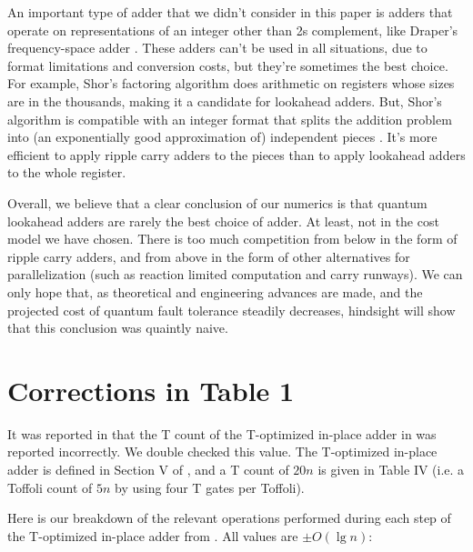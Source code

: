 \documentclass[onecolumn,unpublished]{quantumarticle}
\theoremstyle{definition}
\theoremstyle{definition}
\theoremstyle{definition}
\begin{document}
An important type of adder that we didn't consider in this paper is adders that operate on representations of an integer other than 2s complement, like Draper's frequency-space adder \cite{draper2000qftaddition}.
These adders can't be used in all situations, due to format limitations and conversion costs, but they're sometimes the best choice.
For example, Shor's factoring algorithm \cite{shor1994algorithms} does arithmetic on registers whose sizes are in the thousands, making it a candidate for lookahead adders.
But, Shor's algorithm is compatible with an integer format that splits the addition problem into (an exponentially good approximation of) independent pieces \cite{gidney2019approximate,gidney2019factor}.
It's more efficient to apply ripple carry adders to the pieces than to apply lookahead adders to the whole register.

Overall, we believe that a clear conclusion of our numerics is that quantum lookahead adders are rarely the best choice of adder.
At least, not in the cost model we have chosen.
There is too much competition from below in the form of ripple carry adders, and from above in the form of other alternatives for parallelization (such as reaction limited computation and carry runways).
We can only hope that, as theoretical and engineering advances are made, and the projected cost of quantum fault tolerance steadily decreases, hindsight will show that this conclusion was quaintly naive.




\appendix

\section{Corrections in Table 1}
\label{app:correction}

It was reported in \cite{oonishi2020efficient} that the T count of the T-optimized in-place adder in \cite{thapliyal2020lookahead} was reported incorrectly.
We double checked this value.
The T-optimized in-place adder is defined in Section V of \cite{thapliyal2020lookahead}, and a T count of $20n$ is given in Table IV (i.e. a Toffoli count of $5n$ by using four T gates per Toffoli).

Here is our breakdown of the relevant operations performed during each step of the T-optimized in-place adder from \cite{thapliyal2020lookahead}.
All values are $\pm O(\lg n)$:
\end{document}

